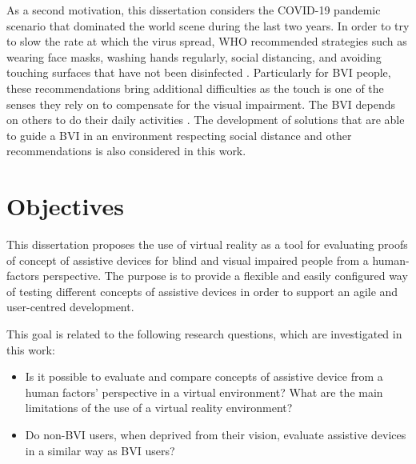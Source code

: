 
As a second motivation, this dissertation considers the COVID-19 pandemic scenario that dominated the world scene during the last two years. In order to try to slow the rate at which the virus spread, WHO recommended strategies such as wearing face masks, washing hands regularly, social distancing, and avoiding touching surfaces that have not been disinfected \cite{who_2020}. Particularly for BVI people, these recommendations bring additional difficulties as the touch is one of the senses they rely on to compensate for the visual impairment. %
The BVI depends on others to do their daily activities \cite{jondani2021strategies}. The development of solutions that are able to guide a BVI in an environment respecting social distance and other recommendations is also considered in this work.

\section{Objectives}
\label{sec:objetivos}


 This dissertation proposes the use of virtual reality as a tool for evaluating proofs of concept of assistive devices for blind and visual impaired people from a human-factors perspective. The purpose is to provide a flexible and easily configured way of testing different concepts of assistive devices in order to support an agile and user-centred development.

 This goal is related to the following research questions, which are investigated in this work:

 \begin{itemize}
    \item Is it possible to evaluate and compare concepts of assistive device from a human factors’ perspective in a virtual environment? What are the main limitations of the use of a virtual reality environment? \label{itm:obj_first}
    \item Do non-BVI users, when deprived from their vision, evaluate assistive devices in a similar way as BVI users? \label{itm:obj_second}
\end{itemize}
 
